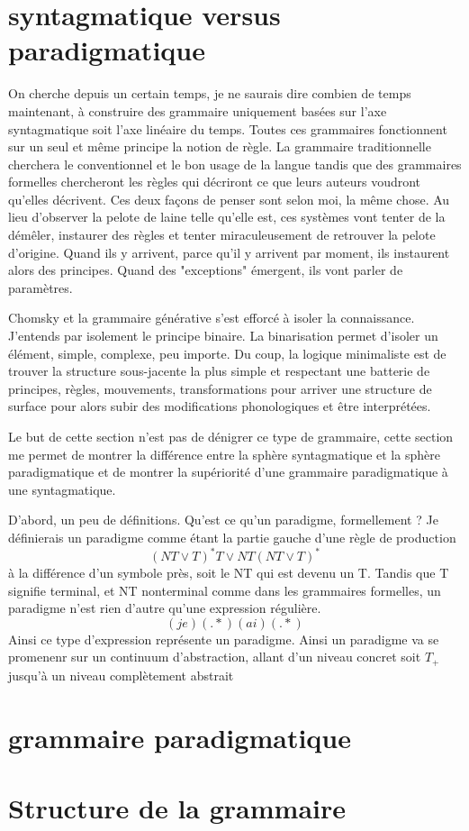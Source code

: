 \documentclass[a4paper,11pt]{article}
\begin{document}
\section{syntagmatique versus paradigmatique}
	On cherche depuis un certain temps, je ne saurais dire combien de temps maintenant, à construire des grammaire uniquement basées sur l'axe syntagmatique soit l'axe linéaire du temps. Toutes ces grammaires fonctionnent sur un seul et même principe
	la notion de règle. La grammaire traditionnelle cherchera le conventionnel et le bon usage de la langue tandis que des grammaires formelles chercheront les règles qui décriront ce que leurs auteurs voudront qu'elles décrivent. 
	Ces deux façons de penser sont selon moi, la même chose. Au lieu d'observer la pelote de laine telle qu'elle est, ces systèmes vont tenter de la démêler, instaurer des règles et tenter miraculeusement de retrouver la pelote d'origine. 
	Quand ils y arrivent, parce qu'il y arrivent par moment, ils instaurent alors des principes. Quand des "exceptions" émergent, ils vont parler de paramètres. 
	
	Chomsky et la grammaire générative s'est efforcé à isoler la connaissance. J'entends par isolement le principe binaire. La binarisation permet d'isoler un élément, simple, complexe, peu importe.
	Du coup, la logique minimaliste est de trouver la structure sous-jacente la plus simple et respectant une batterie de principes, règles, mouvements, transformations pour arriver une structure de surface pour alors subir
	des modifications phonologiques et être interprétées.
	
	Le but de cette section n'est pas de dénigrer ce type de grammaire, cette section me permet de montrer la différence entre la sphère syntagmatique et la sphère paradigmatique et de montrer la supériorité d'une grammaire paradigmatique à une syntagmatique.
	
	D'abord, un peu de définitions. Qu'est ce qu'un paradigme, formellement ? Je définierais un paradigme comme étant la partie gauche d'une règle de production $$(NT \vee T)^* T \vee NT (NT \vee T)^*$$ à la différence d'un symbole près, soit le NT qui est devenu un T.
	Tandis que T signifie terminal, et NT nonterminal comme dans les grammaires formelles, un paradigme n'est rien d'autre qu'une expression régulière. $$(je)(.*)(ai)(.*)$$ Ainsi ce type d'expression représente un paradigme.
	Ainsi un paradigme va se promenenr sur un continuum d'abstraction, allant d'un niveau concret soit $T_+$ jusqu'à un niveau complètement abstrait 
\section{grammaire paradigmatique}

\section{Structure de la grammaire}
\end{document}
